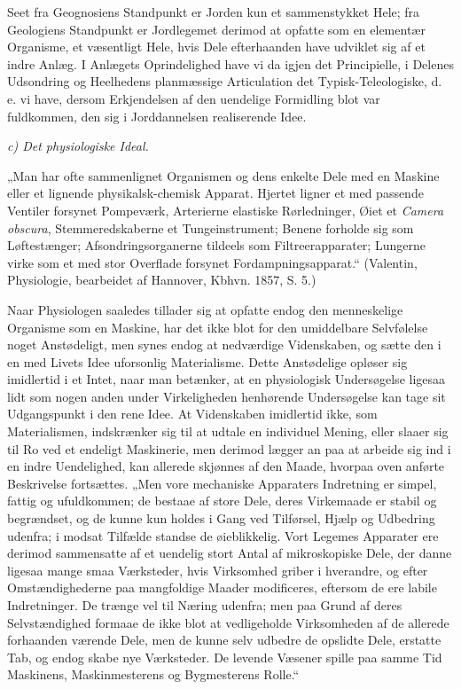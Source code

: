 \documentclass[12pt]{book}
\newcommand{\opage}[1]{\marginnote{\footnotesize\textit{[#1]}}}
\begin{document}
Seet fra Geognosiens Standpunkt er Jorden kun et sammenstykket Hele; fra Geologiens Standpunkt er
Jordlegemet derimod at opfatte som en elementær Organisme, et væsentligt Hele, hvis Dele efterhaanden
have udviklet sig af et indre Anlæg. I Anlægets Oprindelighed have vi da igjen det Principielle, i
Delenes Udsondring og Heelhedens planmæssige Articulation det Typisk-Teleologiske, d. e. vi have,
dersom Erkjendelsen af den uendelige Formidling blot var fuldkommen, den sig i Jorddannelsen
realiserende Idee.
\opage{187} \begin{center}\emph{c) Det physiologiske Ideal.}\end{center}

„Man har ofte sammenlignet Organismen og dens enkelte Dele med en Maskine eller et lignende
physikalsk-chemisk Apparat. Hjertet ligner et med passende Ventiler forsynet Pompeværk, Arterierne
elastiske Rørledninger, Øiet et \textit{Camera obscura}, Stemmeredskaberne et Tungeinstrument; Benene
forholde sig som Løftestænger; Afsondringsorganerne tildeels som Filtreerapparater; Lungerne virke som
et med stor Overflade forsynet Fordampningsapparat.“ (Valentin, Physiologie, bearbeidet af Hannover,
Kbhvn. 1857, S. 5.)

Naar Physiologen saaledes tillader sig at opfatte endog den menneskelige Organisme som en Maskine, har
det ikke blot for den umiddelbare Selvfølelse noget Anstødeligt, men synes endog at nedværdige
Videnskaben, og sætte den i en med Livets Idee uforsonlig Materialisme. Dette Anstødelige opløser sig
imidlertid i et Intet, naar man betænker, at en physiologisk Undersøgelse ligesaa lidt som nogen anden
under Virkeligheden henhørende Undersøgelse kan tage sit Udgangspunkt i den rene Idee. At Videnskaben
imidlertid ikke, som Materialismen, indskrænker sig til at udtale en individuel Mening, eller slaaer
sig til Ro ved et endeligt Maskinerie, men derimod lægger an paa at arbeide sig ind i en indre
Uendelighed, kan allerede skjønnes af den Maade, hvorpaa oven anførte Beskrivelse fortsættes. „Men
vore mechaniske Apparaters Indretning er simpel, fattig og ufuldkommen; de bestaae af store Dele,
deres Virkemaade er stabil og begrændset, og de kunne kun holdes i Gang ved Tilførsel, Hjælp og
Udbedring udenfra; i modsat Tilfælde standse de øieblikkelig. Vort Legemes Apparater ere derimod
sammensatte af et uendelig stort Antal af mikroskopiske Dele, der danne ligesaa mange smaa Værksteder,
hvis Virksomhed griber i hverandre, og efter Omstændighederne paa mangfoldige Maader modificeres,
eftersom de ere labile Indretninger. De trænge vel til Næring udenfra; men paa
\opage{188} Grund af deres Selvstændighed formaae de ikke blot at vedligeholde Virksomheden af de allerede
forhaanden værende Dele, men de kunne selv udbedre de opslidte Dele, erstatte Tab, og endog skabe nye
Værksteder. De levende Væsener spille paa samme Tid Maskinens, Maskinmesterens og Bygmesterens Rolle.“
\end{document}
